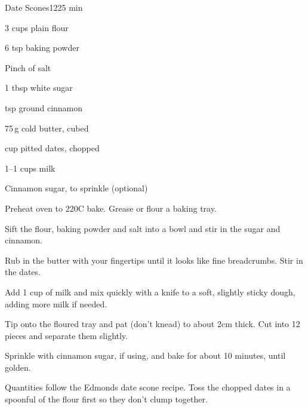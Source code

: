 \begin{recipebox}{Date Scones}{12}{25 min}
\begin{ingredients}
  \item 3 cups plain flour
  \item 6 tsp baking powder
  \item Pinch of salt
  \item 1 tbsp white sugar
  \item {} tsp ground cinnamon
  \item 75\,g cold butter, cubed
  \item {} cup pitted dates, chopped
  \item 1--1 cups milk
  \item Cinnamon sugar, to sprinkle (optional)
\end{ingredients}

\begin{method}
  \item Preheat oven to 220\degree C bake. Grease or flour a baking tray.
  \item Sift the flour, baking powder and salt into a bowl and stir in the sugar and cinnamon.
  \item Rub in the butter with your fingertips until it looks like fine breadcrumbs. Stir in the dates.
  \item Add 1 cup of milk and mix quickly with a knife to a soft, slightly sticky dough, adding more milk if needed.
  \item Tip onto the floured tray and pat (don't knead) to about 2cm thick. Cut into 12 pieces and separate them slightly.
  \item Sprinkle with cinnamon sugar, if using, and bake for about 10 minutes, until golden.
\end{method}

\begin{notes}
Quantities follow the Edmonds date scone recipe.
Toss the chopped dates in a spoonful of the flour first so they don't clump together.
\end{notes}
\end{recipebox}
